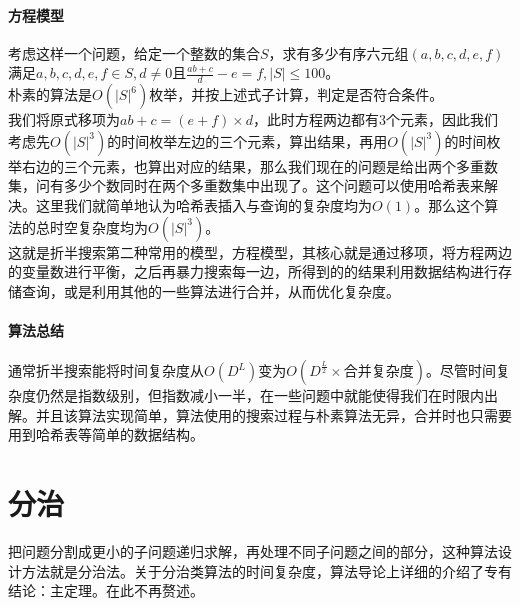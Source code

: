 \documentclass[]{cpp}
\begin{document}
\paragraph{方程模型}
	考虑这样一个问题，给定一个整数的集合$S$，求有多少有序六元组$(a,b,c,d,e,f)$满足$a,b,c,d,e,f\in S,d\ne0$且$\frac{ab+c}{d}-e=f,|S|\leq100$。\\
	朴素的算法是$O(|S|^6)$枚举，并按上述式子计算，判定是否符合条件。\\
	我们将原式移项为$ab+c=(e+f)\times d$，此时方程两边都有$3$个元素，因此我们考虑先$O(|S|^3)$的时间枚举左边的三个元素，算出结果，再用$O(|S|^3)$的时间枚举右边的三个元素，也算出对应的结果，那么我们现在的问题是给出两个多重数集，问有多少个数同时在两个多重数集中出现了。这个问题可以使用哈希表来解决。这里我们就简单地认为哈希表插入与查询的复杂度均为$O(1)$。那么这个算法的总时空复杂度均为$O(|S|^3)$。\\
这就是折半搜索第二种常用的模型，方程模型，其核心就是通过移项，将方程两边的变量数进行平衡，之后再暴力搜索每一边，所得到的的结果利用数据结构进行存储查询，或是利用其他的一些算法进行合并，从而优化复杂度。
\paragraph{算法总结}
	通常折半搜索能将时间复杂度从$O(D^L)$变为$O(D^\frac{L}{2} \times\mbox{合并复杂度})$。尽管时间复杂度仍然是指数级别，但指数减小一半，在一些问题中就能使得我们在时限内出解。并且该算法实现简单，算法使用的搜索过程与朴素算法无异，合并时也只需要用到哈希表等简单的数据结构。
\section{分治} 把问题分割成更小的子问题递归求解，再处理不同子问题之间的部分，这种算法设计方法就是分治法。关于分治类算法的时间复杂度，算法导论上详细的介绍了专有结论：主定理。在此不再赘述。
\end{document}
